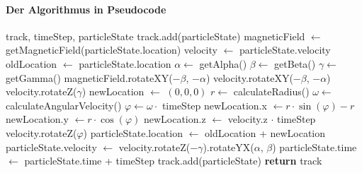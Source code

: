 \paragraph{Der Algorithmus in Pseudocode}
\begin{algorithmic}[1]
  \STATE {}
  \STATE track, timeStep, particleState
  \STATE track.add(particleState)
  \STATE {}
  \STATE magneticField $\leftarrow$ getMagneticField(particleState.location)
  \STATE velocity $\leftarrow$ particleState.velocity
  \STATE oldLocation $\leftarrow$ particleState.location
  \STATE
  \STATE {}
  \STATE $\alpha \leftarrow$ getAlpha()
  \STATE $\beta \leftarrow$ getBeta()
  \STATE $\gamma \leftarrow$ getGamma()
  \STATE
  \STATE {}
  \STATE magneticField.rotateXY($-\beta$, $-\alpha$)
  \STATE velocity.rotateXY($-\beta$, $-\alpha$)
  \STATE velocity.rotateZ($\gamma$)
  \STATE newLocation $\leftarrow$ \(\left(0, 0, 0\right)\)
  \STATE
  \STATE {}
  \STATE $r \leftarrow$ calculateRadius()
  \STATE $\omega \leftarrow$ calculateAngularVelocity()
  \STATE $\varphi \leftarrow \omega \cdot$ timeStep
  \STATE
  \STATE {}
  \STATE newLocation.x $\leftarrow r \cdot \sin(\varphi) -r$
  \STATE newLocation.y $\leftarrow r \cdot \cos(\varphi)$
  \STATE newLocation.z $\leftarrow$ velocity.z $\cdot$ timeStep
  \STATE
  \STATE {}
  \STATE velocity.rotateZ($\varphi$)
  \STATE
  \STATE {}
  \STATE particleState.location $\leftarrow$ oldLocation + newLocation
  \STATE particleState.velocity $\leftarrow$ velocity.rotateZ($-\gamma$).rotateYX($\alpha$, $\beta$)
  \STATE
  \STATE {}
  \STATE particleState.time $\leftarrow$ particleState.time + timeStep
  \STATE
  \STATE {}
  \STATE track.add(particleState)
  \ENDWHILE
  \STATE
  \STATE \textbf{return} track
\end{algorithmic}
